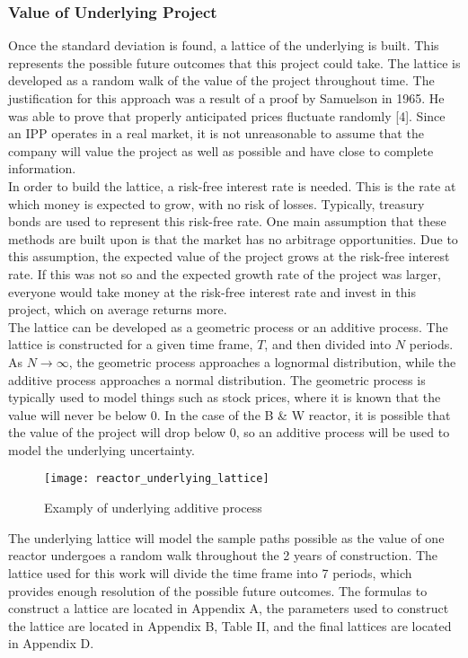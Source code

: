 \subsubsection{Value of Underlying Project}

Once the standard deviation is found, a lattice of the underlying is built.  This represents the possible future outcomes that this project could take.  The lattice is developed as a random walk of the value of the project throughout time.  The justification for this approach was a result of a proof by Samuelson in 1965.  He was able to prove that properly anticipated prices fluctuate randomly [4].  Since an IPP operates in a real market, it is not unreasonable to assume that the company will value the project as well as possible and have close to complete information.  \\

In order to build the lattice, a risk-free interest rate is needed.  This is the rate at which money is expected to grow, with no risk of losses.  Typically, treasury bonds are used to represent this risk-free rate.  One main assumption that these methods are built upon is that the market has no arbitrage opportunities.  Due to this assumption, the expected value of the project grows at the risk-free interest rate.  If this was not so and the expected growth rate of the project was larger, everyone would take money at the risk-free interest rate and invest in this project, which on average returns more.  \\

The lattice can be developed as a geometric process or an additive process.  The lattice is constructed for a given time frame, $T$, and then divided into $N$ periods.  As $N \rightarrow \infty$, the geometric process approaches a lognormal distribution, while the additive process approaches a normal distribution.  The geometric process is typically used to model things such as stock prices, where it is known that the value will never be below 0.  In the case of the B \& W reactor, it is possible that the value of the project will drop below 0, so an additive process will be used to model the underlying uncertainty.

\begin{figure}
\centering
\texttt{[image: reactor\_underlying\_lattice]}
\caption{ Examply of underlying additive process  }
\end{figure}

The underlying lattice will model the sample paths possible as the value of one reactor undergoes a random walk throughout the 2 years of construction.  The lattice used for this work will divide the time frame into 7 periods, which provides enough resolution of the possible future outcomes.  The formulas to construct a lattice are located in Appendix A, the parameters used to construct the lattice are located in Appendix B, Table II, and the final lattices are located in Appendix D.

